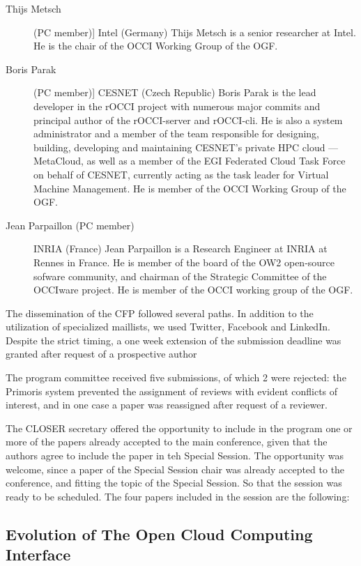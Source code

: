 \documentclass[10pt,a4paper]{article}
\begin{document}
\begin{description}
	\item[Thijs Metsch] (PC member)] Intel (Germany)
	Thijs Metsch is a senior researcher at Intel. He is the chair of the OCCI Working Group of the OGF.
	\item[Boris Parak] (PC member)] CESNET (Czech Republic)
	Boris Parak is the lead developer in the rOCCI project with numerous major commits and principal author of the rOCCI-server and rOCCI-cli. He is also a system administrator and a member of the team responsible for designing, building, developing and maintaining CESNET’s private HPC cloud — MetaCloud, as well as a member of the EGI Federated Cloud Task Force on behalf of CESNET, currently acting as the task leader for Virtual Machine Management. He is member of the OCCI Working Group of the OGF.
	\item[Jean Parpaillon (PC member)] INRIA (France)
	Jean Parpaillon is a Research Engineer at INRIA at Rennes in France. He is member of the board of the OW2 open-source sofware community, and chairman of the Strategic Committee of the OCCIware project. He is member of the OCCI working group of the OGF.
\end{description}

The dissemination of the CFP followed several paths. In addition to the utilization of specialized maillists, we used Twitter, Facebook and LinkedIn. Despite the strict timing, a one week extension of the submission deadline was granted after request of a prospective author

The program committee received five submissions, of which 2 were rejected: the Primoris system prevented the assignment of reviews with evident conflicts of interest, and in one case a paper was reassigned after request of a reviewer.

The CLOSER secretary offered the opportunity to include in the program one or more of the papers already accepted to the main conference, given that the authors agree to include the paper in teh Special Session. The opportunity was welcome, since a paper of the Special Session chair was already accepted to the conference, and fitting the topic of the Special Session. So that the session was ready to be scheduled. The four papers included in the session are the following:

\subsection*{Evolution of The Open Cloud Computing Interface \cite{par16a}}
\end{document}
